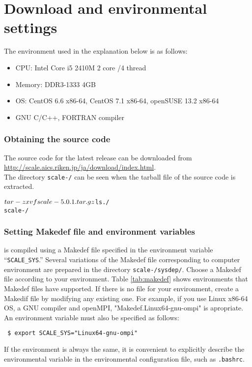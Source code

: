 \section{Download and environmental settings} \label{sec:scale_compile}

The environment used in the explanation below is as follows:
\begin{itemize}
\item CPU: Intel Core i5 2410M 2 core /4 thread
\item Memory: DDR3-1333 4GB
\item OS: CentOS 6.6 x86-64, CentOS 7.1 x86-64, openSUSE 13.2 x86-64
\item GNU C/C++, FORTRAN compiler %
\end{itemize}

\subsubsection{Obtaining the source code} %
The source code for the latest release can be downloaded
from \url{http://scale.aics.riken.jp/ja/download/index.html}.\\
The directory \texttt{scale-{\version}/} can be seen when the tarball file of the source code is extracted.
\begin{alltt}
 $ tar -zxvf scale-{\version}.tar.gz
 $ ls ./
    scale-{\version}/
\end{alltt}

\subsubsection{Setting Makedef file and environment variables} \label{subsec:environment}

\scalelib is compiled using a Makedef file
specified in the environment variable ``\verb|SCALE_SYS|.''
Several variations of the Makedef file corresponding to computer environment are prepared in the directory \texttt{scale-{\version}/sysdep/}.
Choose a Makedef file according to your environment.
Table \ref{tab:makedef} shows environments that Makedef files have supported. If there is no file for your environment, create a Makedif file by modifying any existing one.
For example,
if you use Linux x86-64 OS, a GNU compiler and openMPI,
"Makedef.Linux64-gnu-ompi" is apropriate.
An environment variable must also be specified as follows:
\begin{verbatim}
 $ export SCALE_SYS="Linux64-gnu-ompi"
\end{verbatim}
If the environment is always the same, it is convenient to explicitly describe the environmental variable in the environmental configuration file, such as \verb|.bashrc|.

